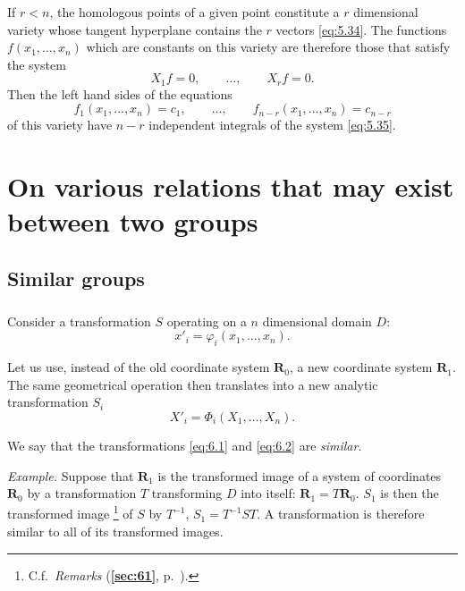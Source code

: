 \documentclass[leqno,11pt]{book}
\makeatletter
\numberwithin{equation}{chapter}
\theoremstyle{shape1}
\theoremstyle{shapesmall}
\let\old@phi\phi
\let\old@varphi\varphi
\let\phi\old@varphi
\let\varphi\old@phi
\newcommand{\fsref}[1]{{\rm\textsection\textbf{\ref{sec:#1}}}}
\newcommand{\somespace}{\vspace{9pt}}
\makeatother
\begin{document}
If $r<n$, the homologous points of a given point constitute a $r$ dimensional variety whose tangent hyperplane contains the $r$ vectors \eqref{eq:5.34}. The functions $f(x_{1},\dots,x_{n})$ which are constants on this variety are therefore those that satisfy the system
\begin{equation}
  \label{eq:5.35}
  X_{1}f=0,\qquad \dots,\qquad X_{r}f=0.
\end{equation}
Then the left hand sides of the equations
\[
f_{1}(x_{1},\dots,x_{n})=c_{1},\qquad\dots,\qquad f_{n-r}(x_{1},\dots,x_{n})=c_{n-r}
\]
of this variety have $n-r$ independent integrals of the system \eqref{eq:5.35}.


\chapter{On various relations that may exist between two groups}
\label{cha:vari-relat-that}

\section{Similar groups}
\label{sec:similar-groups}

\paragraph{}
\label{sec:88}
Consider a transformation $S$ operating on a $n$ dimensional domain $D$:
\begin{equation}
  \label{eq:6.1}
  x'_{i}=\phi_{i}(x_{1},\dots,x_{n}).
\end{equation}

Let us use, instead of the old coordinate system $\mathbf{R}_{0}$, a new coordinate system $\mathbf{R}_{1}$. The same geometrical operation then translates into a new analytic transformation $S_{i}$
\begin{equation}
  \label{eq:6.2}
  X'_{i}=\Phi_{i}(X_{1},\dots,X_{n}).
\end{equation}

We say that the transformations \eqref{eq:6.1} and  \eqref{eq:6.2} are \emph{similar}.

\somespace

{\small
\emph{Example.} Suppose that $\mathbf{R}_{1}$ is the transformed image of a system of coordinates $\mathbf{R}_{0}$ by a transformation $T$ transforming $D$ into itself: $\mathbf{R}_{1}=T\mathbf{R}_{0}$. $S_{1}$ is then the transformed image \footnote{C.f.~\emph{Remarks} (\fsref{61}, p.~\pageref{sec:61}).} of $S$ by $T^{-1}$, $S_{1}=T^{-1}ST$. A transformation is therefore similar to all of its transformed images.
}
\end{document}
